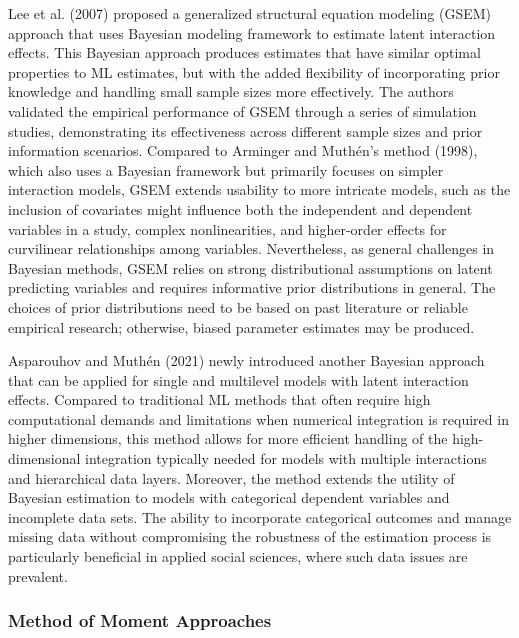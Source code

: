 \documentclass[
  man]{apa6}
\begin{document}
Lee et al. (2007) proposed a generalized structural equation modeling (GSEM) approach that uses Bayesian modeling framework to estimate latent interaction effects. This Bayesian approach produces estimates that have similar optimal properties to ML estimates, but with the added flexibility of incorporating prior knowledge and handling small sample sizes more effectively. The authors validated the empirical performance of GSEM through a series of simulation studies, demonstrating its effectiveness across different sample sizes and prior information scenarios. Compared to Arminger and Muthén's method (1998), which also uses a Bayesian framework but primarily focuses on simpler interaction models, GSEM extends usability to more intricate models, such as the inclusion of covariates might influence both the independent and dependent variables in a study, complex nonlinearities, and higher-order effects for curvilinear relationships among variables. Nevertheless, as general challenges in Bayesian methods, GSEM relies on strong distributional assumptions on latent predicting variables and requires informative prior distributions in general. The choices of prior distributions need to be based on past literature or reliable empirical research; otherwise, biased parameter estimates may be produced.

Asparouhov and Muthén (2021) newly introduced another Bayesian approach that can be applied for single and multilevel models with latent interaction effects. Compared to traditional ML methods that often require high computational demands and limitations when numerical integration is required in higher dimensions, this method allows for more efficient handling of the high-dimensional integration typically needed for models with multiple interactions and hierarchical data layers. Moreover, the method extends the utility of Bayesian estimation to models with categorical dependent variables and incomplete data sets. The ability to incorporate categorical outcomes and manage missing data without compromising the robustness of the estimation process is particularly beneficial in applied social sciences, where such data issues are prevalent.

\hypertarget{method-of-moment-approaches}{%
\subsubsection{Method of Moment Approaches}\label{method-of-moment-approaches}}
\end{document}
